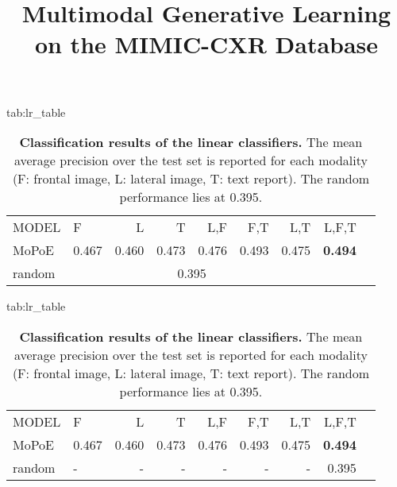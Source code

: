 \documentclass{midl} %
\title[Multimodal Generative Learning on the MIMIC-CXR Database]{Multimodal Generative Learning on the MIMIC-CXR Database}
\begin{document}
\maketitle
    \begin{table}[htbp]
    \floatconts
      {tab:lr_table}%
      {\caption{\textbf{Classification results of the linear classifiers.} 
      The mean average precision over the test set is reported for each modality (F: frontal image, L: lateral image, T: text report).
      The random performance lies at 0.395.}}%
      {\begin{tabular}{llrrrrrrr}
                MODEL    & F     & L     & T     & L,F   & F,T   & L,T   & L,F,T          \\
                MoPoE  & 0.467 & 0.460 & 0.473 & 0.476 & 0.493 & 0.475 & \textbf{0.494} \\
                
                random &  \multicolumn{6}{c}{0.395}
    
            \end{tabular}}
    \end{table}
    
        \begin{table}[htbp]
    \floatconts
      {tab:lr_table}%
      {\caption{\textbf{Classification results of the linear classifiers.} 
      The mean average precision over the test set is reported for each modality (F: frontal image, L: lateral image, T: text report).
      The random performance lies at 0.395.}}%
      {\begin{tabular}{llrrrrrrr}
                MODEL    & F     & L     & T     & L,F   & F,T   & L,T   & L,F,T          \\
                MoPoE  & 0.467 & 0.460 & 0.473 & 0.476 & 0.493 & 0.475 & \textbf{0.494} \\
                random & - & - & - & - & - & -& 0.395
    
            \end{tabular}}
    \end{table}
    
\end{document}
